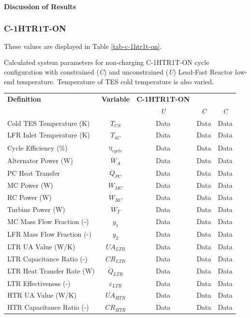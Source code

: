 \begin{paracol}{2}
\textbf{Discussion of Results}

\subsubsection{C-1HTR1T-ON}

These values are displayed in Table \ref{tab-c-1htr1t-on}.

\begin{specialtable}[htbp] 
    \caption{Calculated system parameters for non-charging C-1HTR1T-ON cycle configuration with constrained (\textit{C}) and unconstrained (\textit{U}) Lead-Fast Reactor low-end temperature. Temperature of TES cold temperature is also varied.\label{tab-c-1htr1t-on}}
    \begin{tabular}{lcccc}
    \toprule
    \textbf{Definition} & \textbf{Variable} & \textbf{C-1HTR1T-ON}\\
    & & \textit{U} & \textit{C} & \textit{C}\\
    \midrule
    Cold TES Temperature (K)	&	$T_{CS}$	&	Data	&	Data	&	Data	\\
    LFR Inlet Temperature (K)	&	$T_{4C}$	&	Data	&	Data	&	Data	\\
    Cycle Efficiency (\%)	&	$\eta_{cycle}$	&	Data	&	Data	&	Data	\\
    Alternator Power (W)	&	$\dot{W}_{A}$	&	Data	&	Data	&	Data	\\
    PC Heat Transfer	&	$\dot{Q}_{PC}$	&	Data	&	Data	&	Data	\\
    MC Power (W)	&	$\dot{W}_{MC}$	&	Data	&	Data	&	Data	\\
    RC Power (W)	&	$\dot{W}_{RC}$	&	Data	&	Data	&	Data	\\
    Turbine Power (W)	&	$\dot{W}_{T}$	&	Data	&	Data	&	Data	\\
    MC Mass Flow Fraction (-)	&	$y_{1}$	&	Data	&	Data	&	Data	\\
    LFR Mass Flow Fraction (-)	&	$y_{2}$	&	Data	&	Data	&	Data	\\
    LTR UA Value (W/K)	&	$UA_{LTR}$	&	Data	&	Data	&	Data	\\
    LTR Capacitance Ratio (-)	&	$CR_{LTR}$	&	Data	&	Data	&	Data	\\
    LTR Heat Transfer Rate (W)	&	$\dot{Q}_{LTR}$	&	Data	&	Data	&	Data	\\
    LTR Effectiveness (-)	&	$\varepsilon_{LTR}$	&	Data	&	Data	&	Data	\\
    HTR UA Value (W/K)	&	$UA_{HTR}$	&	Data	&	Data	&	Data	\\
    HTR Capacitance Ratio (-)	&	$CR_{HTR}$	&	Data	&	Data	&	Data	\\

\end{tabular}
\end{specialtable}
\end{paracol}
